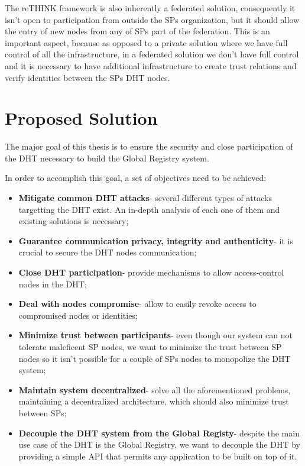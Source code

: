 The reTHINK framework is also inherently a federated solution, consequently it isn't open to participation from outside the \acp{SP} organization, but it should allow the entry of new nodes from any of \acp{SP} part of the federation.
This is an important aspect, because as opposed to a private solution where we have full control of all the infrastructure, in a federated solution we don't have full control and it is necessary to have additional infrastructure to create trust relations and verify identities between the \acp{SP} \ac{DHT} nodes.

\section{Proposed Solution}
\label{section:proposed}

The major goal of this thesis is to ensure the security and close participation of the \ac{DHT} necessary to build the Global Registry system.

In order to accomplish this goal, a set of objectives need to be achieved:

\begin{itemize}
  \item \textbf{Mitigate common \ac{DHT} attacks}- several different types of attacks targetting the \ac{DHT} exist. An in-depth analysis of each one of them and existing solutions is necessary;
	\item \textbf{Guarantee communication privacy, integrity and authenticity}- it is crucial to secure the \ac{DHT} nodes communication;
	\item \textbf{Close DHT participation}- provide mechanisms to allow access-control nodes in the \ac{DHT};
	\item \textbf{Deal with nodes compromise}- allow to easily revoke access to compromised nodes or identities;
  \item \textbf{Minimize trust between participants}- even though our system can not tolerate maleficent \ac{SP} nodes, we want to minimize the trust between \ac{SP} nodes so it isn't possible for a couple of \acp{SP} nodes to monopolize the DHT system;
  \item \textbf{Maintain system decentralized}- solve all the aforementioned problems, maintaining a decentralized architecture, which should also minimize trust between \acp{SP};
  \item \textbf{Decouple the DHT system from the Global Registy}- despite the main use case of the DHT is the Global Registry, we want to decouple the DHT by providing a simple \ac{API} that permits any application to be built on top of it.
\end{itemize}


